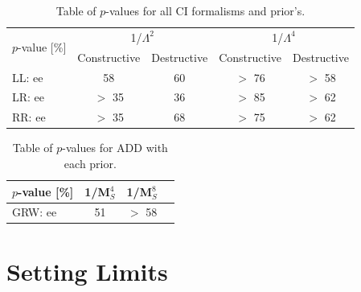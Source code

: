 

    \begin {table}[h]
        \begin{center}
        \begin{tabular}{ | l | c | c | c | c | } 
            \hline
            \multirow{2}{*}{$p$-value [\%]} & \multicolumn{2}{c|}{1/$\Lambda^2$} & \multicolumn{2}{c|}{1/$\Lambda^4$} \\
            \cline{2-5}
            & Constructive & Destructive & Constructive & Destructive \\
            \hline
            LL: ee & 58 & 60 & $>$ 76 & $>$ 58 \\
            LR: ee & $>$ 35 & 36 & $>$ 85 & $>$ 62 \\
            RR: ee & $>$ 35 & 68 & $>$ 75 & $>$ 62 \\
            \hline
        \end{tabular}
        \caption{Table of $p$-values for all CI formalisms and prior's.}
        \label{tab:pvalue_CI}
        \end{center}
    \end {table}


    \begin {table}[h]
        \begin{center}
        \begin{tabular}{ | l | c | c | c | } 
            \hline
            $p$-value [\%] & 1/M$_S^4$ & 1/M$_S^8$ \\
            \hline
            GRW: ee & 51 & $>$ 58 \\
            \hline
        \end{tabular}
        \caption{Table of $p$-values for ADD with each prior.}
        \label{tab:pvalue_ADD}
        \end{center}
    \end {table}






\section{Setting Limits}
    
